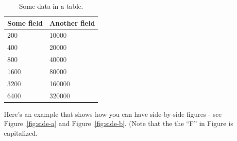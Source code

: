 \documentclass[pageno]{jpaper}
\begin{document}
\begin{table}[hbt]
	\centering
	\begin{tabular}{|l|l|} \hline
		\textbf{Some field} & \textbf{Another field}\\\hline
		200          &  10000 \\ \hline 
		400          &  20000 \\ \hline 
		800          &  40000 \\ \hline 
		1600        &  80000 \\ \hline 
		3200        &  160000 \\ \hline 
		6400        &  320000 \\ \hline 
	\end{tabular}
	\caption{Some data in a table. }
	\label{table:data}
\end{table}


Here's an example that shows how you can have side-by-side figures -
see Figure~\ref{fig:side-a} and Figure~\ref{fig:side-b}.  (Note that
the the ``F'' in Figure is capitalized. 
\end{document}
